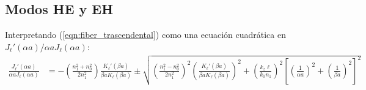
\subsection{Modos HE y EH}
Interpretando (\ref{eqn:fiber_trascendental}) como una ecuación cuadrática en $J_\ell'(\alpha a)/\alpha a J_\ell(\alpha a)$:
\begin{align*}
	\frac{J_\ell'(\alpha a)}{\alpha a J_\ell(\alpha a)} &= -\left(\frac{n_1^2+n_0^2}{2n_1^2}\right) \frac{K_\ell'(\beta a)}{\beta a K_\ell(\beta a)}\pm\sqrt{\left(\frac{n_1^2-n_0^2}{2n_1^2}\right)^2\left(\frac{K_\ell'(\beta a)}{\beta a K_\ell(\beta a)}\right)^2+ \left( \frac{ k_z \ell}{ k_0 n_1} \right)^2\left[ \left(\frac{1}{\alpha a}\right)^2 + \left(\frac{1}{\beta a}\right)^2 \right]^2 }
\end{align*}

